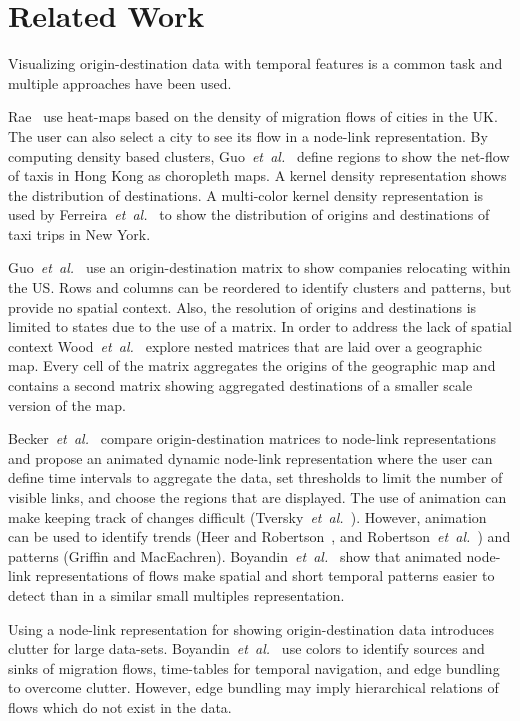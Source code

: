 \documentclass[a4paper,twocolumn]{article}
\author{Josua Krause}
\newcommand{\etal}{\emph{et~al.~}}
\begin{document}
\section*{Related Work}
Visualizing origin-destination data with temporal features
is a common task and multiple approaches have been used.

Rae~\cite{Rae2009} use heat-maps based on
the density of migration flows of cities in the UK.
The user can also select a city to see its flow
in a node-link representation.
By computing density based clusters,
Guo~\etal\cite{Guo2012} define regions
to show the net-flow of taxis in Hong Kong
as choropleth maps.
A kernel density representation shows
the distribution of destinations.
A multi-color kernel density representation is
used by Ferreira~\etal\cite{Ferreira2013}
to show the distribution of
origins and destinations of taxi trips in New York.

Guo~\etal\cite{Guo2006} use an origin-destination matrix
to show companies relocating within the US.
Rows and columns can be reordered to identify clusters
and patterns, but provide no spatial context.
Also, the resolution of origins and destinations is limited
to states due to the use of a matrix.
In order to address the lack of spatial context
Wood~\etal\cite{Wood2002} explore nested matrices
that are laid over a geographic map.
Every cell of the matrix aggregates the origins
of the geographic map and contains
a second matrix showing aggregated destinations of
a smaller scale version of the map.

Becker~\etal\cite{Becker1995} compare
origin-destination matrices to node-link representations
and propose an animated dynamic node-link representation
where the user can define time intervals to aggregate the data,
set thresholds to limit the number of visible links,
and choose the regions that are displayed.
The use of animation can make keeping track of changes
difficult (Tversky~\etal\cite{Tversky2002}).
However, animation can be used to
identify trends (Heer and Robertson~\cite{Heer2007},
and Robertson~\etal\cite{Robertson}) and
patterns (Griffin and MacEachren\cite{Griffin2006}).
Boyandin~\etal\cite{Boyandin2012} show that animated
node-link representations of flows make spatial and
short temporal patterns easier to detect than in
a similar small multiples representation.

Using a node-link representation for showing origin-destination
data introduces clutter for large data-sets.
Boyandin~\etal\cite{Boyandin2008} use colors to identify
sources and sinks of migration flows,
time-tables for temporal navigation, and
edge bundling to overcome clutter.
However, edge bundling may imply hierarchical
relations of flows which do not exist in the data.
\end{document}

